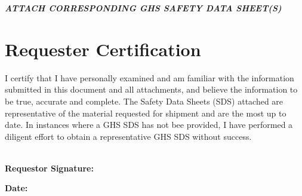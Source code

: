 \documentclass[{{ data.paper }}, 11pt]{article}
\begin{document}
\begin{center}
\textbf{\textit{ATTACH CORRESPONDING GHS SAFETY DATA SHEET(S)} }
\end{center}

\section*{Requester Certification}
I certify that I have personally examined and am familiar with the information submitted in this document and all attachments, and believe the information to be true, accurate and complete. The Safety Data Sheets (SDS) attached are representative of the material requested for shipment and are the most up to date. In instances where a GHS SDS has not bee provided, I have performed a diligent effort to obtain a representative GHS SDS without success.\\
\\
\begin{minipage}[t]{0.7\textwidth}
\textbf{Requestor Signature:} \hrulefill
\end{minipage}
\quad
\begin{minipage}[t]{0.3\textwidth}
\textbf{Date:}
\end{minipage}
\end{document}
